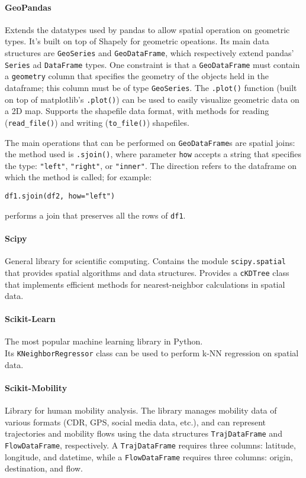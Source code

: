 \paragraph{GeoPandas}
Extends the datatypes used by pandas to allow spatial operation on geometric types. It's built on top of Shapely for geometric opeations. Its main data structures are \texttt{GeoSeries} and \texttt{GeoDataFrame}, which respectively extend pandas' \texttt{Series} ad \texttt{DataFrame} types. One constraint is that a \texttt{GeoDataFrame} must contain a \texttt{geometry} column that specifies the geometry of the objects held in the dataframe; this column must be of type \texttt{GeoSeries}. The \texttt{.plot()} function (built on top of matplotlib's \texttt{.plot()}) can be used to easily visualize geometric data on a 2D map. Supports the shapefile data format, with methods for reading (\texttt{read\_file()}) and writing (\texttt{to\_file()}) shapefiles.

The main operations that can be performed on \texttt{GeoDataFrame}s are spatial joins: the method used is \texttt{.sjoin()}, where parameter \texttt{how} accepts a string that specifies the type: \texttt{"left"}, \texttt{"right"}, or \texttt{"inner"}. The direction refers to the dataframe on which the method is called; for example:
\begin{center}
    \texttt{df1.sjoin(df2, how="left")}
\end{center}
performs a join that preserves all the rows of \texttt{df1}.

\paragraph{Scipy}
General library for scientific computing. Contains the module \texttt{scipy.spatial} that provides spatial algorithms and data structures. Provides a \texttt{cKDTree} class that implements efficient methods for nearest-neighbor calculations in spatial data.

\paragraph{Scikit-Learn}
The most popular machine learning library in Python. \\
Its \texttt{KNeighborRegressor} class can be used to perform k-NN regression on spatial data.

\paragraph{Scikit-Mobility}
Library for human mobility analysis. The library manages mobility data of various formats (CDR, GPS, social media data, etc.), and can represent trajectories and mobility flows using the data structures \texttt{TrajDataFrame} and \texttt{FlowDataFrame}, respectively. A \texttt{TrajDataFrame} requires three columns: latitude, longitude, and datetime, while a \texttt{FlowDataFrame} requires three columns: origin, destination, and flow.

